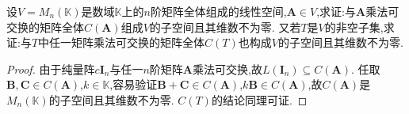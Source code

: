 \documentclass[../../main.tex]{subfiles}%
\begin{document}
\begin{example}\label{example:矩阵乘法可交换的子空间C(A)}
设\(V = M_n(\mathbb{K})\)是数域\(\mathbb{K}\)上的\(n\)阶矩阵全体组成的线性空间,\(\boldsymbol{A}\in V\),求证:与\(\boldsymbol{A}\)乘法可交换的矩阵全体\(C(\boldsymbol{A})\)组成\(V\)的子空间且其维数不为零. 又若\(T\)是\(V\)的非空子集,求证:与\(T\)中任一矩阵乘法可交换的矩阵全体\(C(T)\)也构成\(V\)的子空间且其维数不为零.
\end{example}
\begin{proof}
由于纯量阵\(c\boldsymbol{I}_n\)与任一\(n\)阶矩阵\(\boldsymbol{A}\)乘法可交换,故\(L(\boldsymbol{I}_n)\subseteq C(\boldsymbol{A})\). 任取\(\boldsymbol{B},\boldsymbol{C}\in C(\boldsymbol{A})\),\(k\in\mathbb{K}\),容易验证\(\boldsymbol{B}+\boldsymbol{C}\in C(\boldsymbol{A})\),\(k\boldsymbol{B}\in C(\boldsymbol{A})\),故\(C(\boldsymbol{A})\)是\(M_n(\mathbb{K})\)的子空间且其维数不为零. \(C(T)\)的结论同理可证.
\end{proof}
\end{document}
